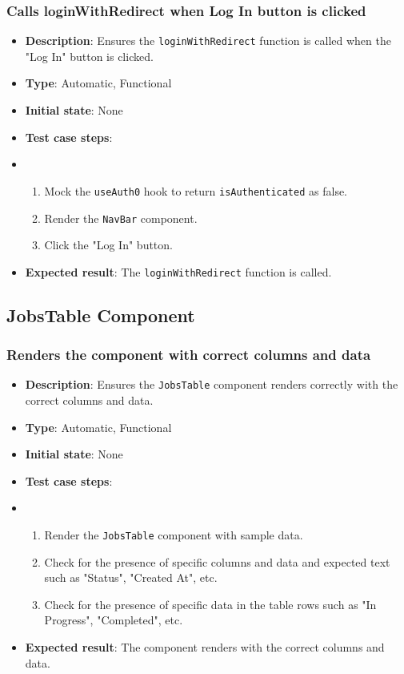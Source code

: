 \documentclass[12pt, titlepage]{article}
\begin{document}
\subsubsection{Calls loginWithRedirect when Log In button is clicked}
\begin{itemize}
    \item \textbf{Description}: Ensures the \texttt{loginWithRedirect} function is called when the "Log In" button is clicked.
    \item \textbf{Type}: Automatic, Functional
    \item \textbf{Initial state}: None
    \item \textbf{Test case steps}:
    \item \begin{enumerate}
        \item Mock the \texttt{useAuth0} hook to return \texttt{isAuthenticated} as false.
        \item Render the \texttt{NavBar} component.
        \item Click the "Log In" button.
    \end{enumerate}
    \item \textbf{Expected result}: The \texttt{loginWithRedirect} function is called.
\end{itemize}

\subsection{JobsTable Component}
\subsubsection{Renders the component with correct columns and data}
\begin{itemize}
    \item \textbf{Description}: Ensures the \texttt{JobsTable} component renders correctly with the correct columns and data.
    \item \textbf{Type}: Automatic, Functional
    \item \textbf{Initial state}: None
    \item \textbf{Test case steps}:
    \item \begin{enumerate}
        \item Render the \texttt{JobsTable} component with sample data.
        \item Check for the presence of specific columns and data and expected text such as "Status", "Created At", etc.
        \item Check for the presence of specific data in the table rows such as "In Progress", "Completed", etc.
    \end{enumerate}
    \item \textbf{Expected result}: The component renders with the correct columns and data.
\end{itemize}
\end{document}
